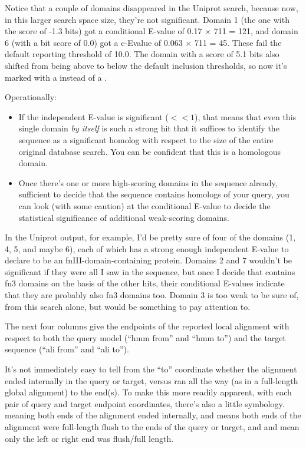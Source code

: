 Notice that a couple of domains disappeared in the Uniprot search,
because now, in this larger search space size, they're not
significant. Domain 1 (the one with the score of -1.3 bits) got a
conditional E-value of 0.17 $\times$ 711 = 121, and domain 6 (with a
bit score of 0.0) got a c-Evalue of 0.063 $\times$ 711 = 45. These
fail the default reporting threshold of 10.0. The domain with a score
of 5.1 bits also shifted from being above to below the default
inclusion thresholds, so now it's marked with a  instead of a
\ccode{!}.

Operationally:

\begin{itemize}
\item If the independent E-value is significant ($<<1$), that means
that even this single domain \emph{by itself} is such a strong hit
that it suffices to identify the sequence as a significant homolog
with respect to the size of the entire original database search. You
can be confident that this is a homologous domain.

\item Once there's one or more high-scoring domains in the sequence
already, sufficient to decide that the sequence contains homologs of
your query, you can look (with some caution) at the conditional
E-value to decide the statistical significance of additional
weak-scoring domains.
\end{itemize}

In the Uniprot output, for example, I'd be pretty sure of four of the
domains (1, 4, 5, and maybe 6), each of which has a strong enough
independent E-value to declare  to be an
fnIII-domain-containing protein. Domains 2 and 7 wouldn't be
significant if they were all I saw in the sequence, but once I decide
that  contains fn3 domains on the basis of the
other hits, their conditional E-values indicate that they are probably
also fn3 domains too. Domain 3 is too weak to be sure of, from this
search alone, but would be something to pay attention to.

The next four columns give the endpoints of the reported local
alignment with respect to both the query model (``hmm from'' and ``hmm
to'') and the target sequence (``ali from'' and ``ali to''). 

It's not immediately easy to tell from the ``to'' coordinate whether
the alignment ended internally in the query or target, versus ran all
the way (as in a full-length global alignment) to the end(s). To make
this more readily apparent, with each pair of query and target
endpoint coordinates, there's also a little symbology. 
meaning both ends of the alignment ended internally, and \prog{[]}
means both ends of the alignment were full-length flush to the ends of
the query or target, and \prog{[.} and \prog{.]} mean only the left or
right end was flush/full length. 

